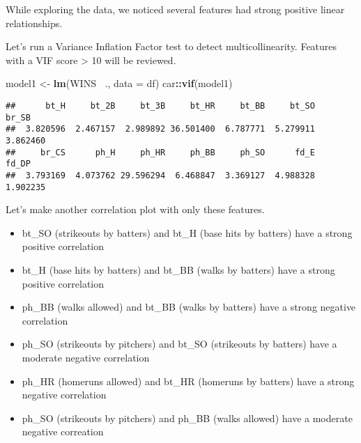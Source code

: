 \documentclass[]{article}
\newenvironment{Shaded}{\begin{snugshade}}{\end{snugshade}}
\newcommand{\DataTypeTok}[1]{\textcolor[rgb]{0.13,0.29,0.53}{#1}}
\newcommand{\KeywordTok}[1]{\textcolor[rgb]{0.13,0.29,0.53}{\textbf{#1}}}
\newcommand{\NormalTok}[1]{#1}
\newcommand{\OperatorTok}[1]{\textcolor[rgb]{0.81,0.36,0.00}{\textbf{#1}}}
\newcommand{\StringTok}[1]{\textcolor[rgb]{0.31,0.60,0.02}{#1}}
\providecommand{\tightlist}{%
  \setlength{\itemsep}{0pt}\setlength{\parskip}{0pt}}
\begin{document}
While exploring the data, we noticed several features had strong
positive linear relationships.

Let's run a Variance Inflation Factor test to detect multicollinearity.
Features with a VIF score \textgreater{} 10 will be reviewed.

\begin{Shaded}
\begin{Highlighting}[]
\NormalTok{model1 <-}\StringTok{ }\KeywordTok{lm}\NormalTok{(WINS }\OperatorTok{~}\NormalTok{., }\DataTypeTok{data =}\NormalTok{ df)}
\NormalTok{car}\OperatorTok{::}\KeywordTok{vif}\NormalTok{(model1)}
\end{Highlighting}
\end{Shaded}

\begin{verbatim}
##      bt_H     bt_2B     bt_3B     bt_HR     bt_BB     bt_SO     br_SB 
##  3.820596  2.467157  2.989892 36.501400  6.787771  5.279911  3.862460 
##     br_CS      ph_H     ph_HR     ph_BB     ph_SO      fd_E     fd_DP 
##  3.793169  4.073762 29.596294  6.468847  3.369127  4.988328  1.902235
\end{verbatim}

Let's make another correlation plot with only these features.

\begin{itemize}
\tightlist
\item
  bt\_SO (strikeouts by batters) and bt\_H (base hits by batters) have a
  strong positive correlation
\item
  bt\_H (base hits by batters) and bt\_BB (walks by batters) have a
  strong positive correlation
\item
  ph\_BB (walks allowed) and bt\_BB (walks by batters) have a strong
  negative correlation
\item
  ph\_SO (strikeouts by pitchers) and bt\_SO (strikeouts by batters)
  have a moderate negative correlation
\item
  ph\_HR (homeruns allowed) and bt\_HR (homeruns by batters) have a
  strong negative correlation
\item
  ph\_SO (strikeouts by pitchers) and ph\_BB (walks allowed) have a
  moderate negative correation
\end{itemize}
\end{document}
